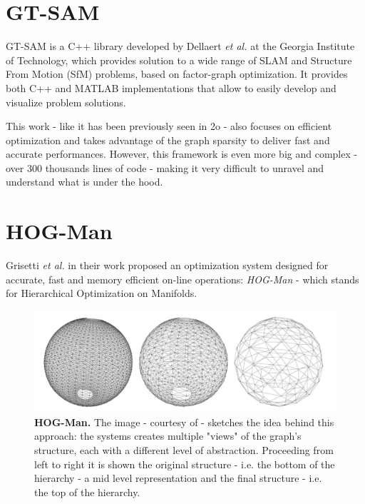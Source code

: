 \section{GT-SAM}\label{sec:gtsam}
GT-SAM is a C++ library developed by Dellaert \textit{et al.} \cite{dellaert2012gtsam} at the Georgia Institute of Technology, which provides solution to a wide range of SLAM and Structure From Motion (SfM) problems, based on factor-graph optimization. It provides both C++ and MATLAB implementations that allow to easily develop and visualize problem solutions. 

This work - like it has been previously seen in \g2o - also focuses on efficient optimization and takes advantage of the graph sparsity to deliver fast and accurate performances. However, this framework is even more big and complex - over 300 thousands lines of code - making it very difficult to unravel and understand what is under the hood.

\section{HOG-Man}\label{sec:hogman}
Grisetti \textit{et al.} in their work \cite{grisetti2010hogman} proposed an optimization system designed for accurate, fast and memory efficient on-line operations: \textit{HOG-Man} - which stands for Hierarchical Optimization on Manifolds.

\begin{figure}[!hbt]
    \centering
    \includegraphics[width=\textwidth]{figures/01_related/hogman.png}
    \caption{\textbf{HOG-Man.} The image - courtesy of \cite{grisetti2010hogman} - sketches the idea behind this approach: the systems creates multiple "views" of the graph's structure, each with a different level of abstraction. Proceeding from left to right it is shown the original structure - i.e. the bottom of the hierarchy - a mid level representation and the final structure - i.e. the top of the hierarchy.} 
    \label{fig:hogman}
\end{figure}


